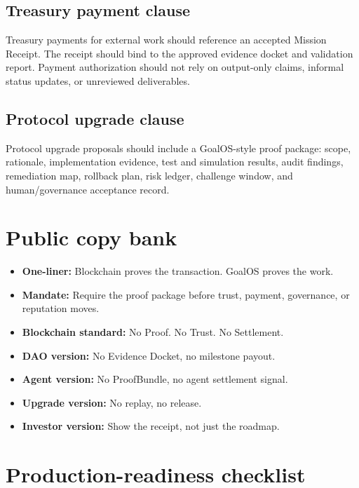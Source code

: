 \documentclass[11pt]{article}
\begin{document}
\subsection{Treasury payment clause}

Treasury payments for external work should reference an accepted Mission Receipt. The receipt should bind to the approved evidence docket and validation report. Payment authorization should not rely on output-only claims, informal status updates, or unreviewed deliverables.

\subsection{Protocol upgrade clause}

Protocol upgrade proposals should include a GoalOS-style proof package: scope, rationale, implementation evidence, test and simulation results, audit findings, remediation map, rollback plan, risk ledger, challenge window, and human/governance acceptance record.

\section{Public copy bank}

\begin{itemize}
  \item \textbf{One-liner:} Blockchain proves the transaction. GoalOS proves the work.
  \item \textbf{Mandate:} Require the proof package before trust, payment, governance, or reputation moves.
  \item \textbf{Blockchain standard:} No Proof. No Trust. No Settlement.
  \item \textbf{DAO version:} No Evidence Docket, no milestone payout.
  \item \textbf{Agent version:} No ProofBundle, no agent settlement signal.
  \item \textbf{Upgrade version:} No replay, no release.
  \item \textbf{Investor version:} Show the receipt, not just the roadmap.
\end{itemize}

\section{Production-readiness checklist}
\end{document}
